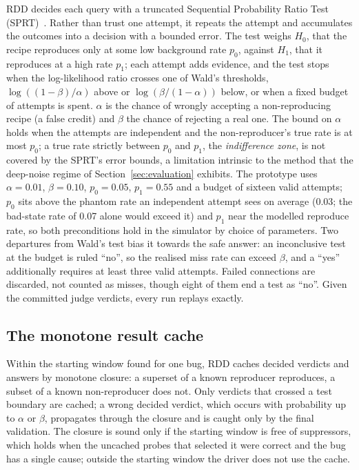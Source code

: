 RDD decides each query with a truncated Sequential Probability Ratio Test
(SPRT)~\cite{sprt1945}. Rather than trust one attempt, it repeats the attempt and
accumulates the outcomes into a decision with a bounded error. The test weighs
$H_0$, that the recipe reproduces only at some low background rate $p_0$, against
$H_1$, that it reproduces at a high rate $p_1$; each attempt adds evidence, and
the test stops when the log-likelihood ratio crosses one of Wald's thresholds,
$\log((1-\beta)/\alpha)$ above or $\log(\beta/(1-\alpha))$ below, or when a fixed
budget of attempts is spent. $\alpha$ is the chance of wrongly accepting a
non-reproducing recipe (a false credit) and $\beta$ the chance of rejecting a
real one. The bound on $\alpha$ holds when the attempts are independent and the
non-reproducer's true rate is at most $p_0$; a true rate strictly between $p_0$
and $p_1$, the \emph{indifference zone}, is not covered by the SPRT's error bounds, a limitation intrinsic to the method that the deep-noise regime of
Section~\ref{sec:evaluation} exhibits. The prototype uses $\alpha = 0.01$,
$\beta = 0.10$, $p_0 = 0.05$, $p_1 = 0.55$ and a budget of sixteen valid attempts;
$p_0$ sits above the phantom rate an independent attempt sees on average (0.03; the
bad-state rate of 0.07 alone would exceed it) and $p_1$ near the modelled reproduce rate, so both preconditions hold in the simulator by choice of parameters. Two
departures from Wald's test bias it towards the safe answer: an inconclusive test
at the budget is ruled ``no'', so the realised miss rate can exceed $\beta$, and a
``yes'' additionally requires at least three valid attempts. Failed connections
are discarded, not counted as misses, though eight of them end a test as ``no''. Given the committed judge verdicts, every run replays exactly.

\subsection{The monotone result cache}

Within the starting window found for one bug, RDD caches decided verdicts and
answers by monotone closure: a superset of a known reproducer reproduces, a
subset of a known non-reproducer does not. Only verdicts that crossed a test
boundary are cached; a wrong decided verdict, which occurs with probability up
to $\alpha$ or $\beta$, propagates through the closure and is caught only by the
final validation. The closure is sound only if the starting window is free of
suppressors, which holds when the uncached probes that selected it were correct
and the bug has a single cause; outside the starting window the driver does not
use the cache.

